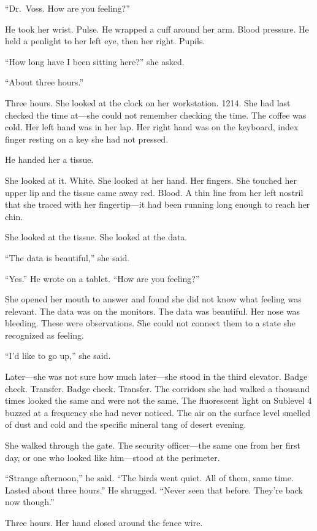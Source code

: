 \documentclass[12pt]{article}
\begin{document}
``Dr.\ Voss. How are you feeling?''

He took her wrist. Pulse. He wrapped a cuff around her arm. Blood pressure. He held a penlight to her left eye, then her right. Pupils.

``How long have I been sitting here?'' she asked.

``About three hours.''

Three hours. She looked at the clock on her workstation. 1214. She had last checked the time at---she could not remember checking the time. The coffee was cold. Her left hand was in her lap. Her right hand was on the keyboard, index finger resting on a key she had not pressed.

He handed her a tissue.

She looked at it. White. She looked at her hand. Her fingers. She touched her upper lip and the tissue came away red. Blood. A thin line from her left nostril that she traced with her fingertip---it had been running long enough to reach her chin.

She looked at the tissue. She looked at the data.

``The data is beautiful,'' she said.

``Yes.'' He wrote on a tablet. ``How are you feeling?''

She opened her mouth to answer and found she did not know what feeling was relevant. The data was on the monitors. The data was beautiful. Her nose was bleeding. These were observations. She could not connect them to a state she recognized as feeling.

``I'd like to go up,'' she said.

Later---she was not sure how much later---she stood in the third elevator. Badge check. Transfer. Badge check. Transfer. The corridors she had walked a thousand times looked the same and were not the same. The fluorescent light on Sublevel 4 buzzed at a frequency she had never noticed. The air on the surface level smelled of dust and cold and the specific mineral tang of desert evening.

She walked through the gate. The security officer---the same one from her first day, or one who looked like him---stood at the perimeter.

``Strange afternoon,'' he said. ``The birds went quiet. All of them, same time. Lasted about three hours.'' He shrugged. ``Never seen that before. They're back now though.''

Three hours. Her hand closed around the fence wire.
\end{document}
